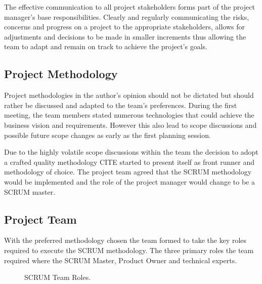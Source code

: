 \documentclass[12pt]{witseiepaper}
\begin{document}
The effective communication to all project stakeholders forms part of the project manager’s base responsibilities. Clearly and regularly communicating the risks, concerns and progress on a project to the appropriate stakeholders, allows for adjustments and decisions to be made in smaller increments thus allowing the team to adapt and remain on track to achieve the project’s goals.

\subsection{Project Methodology}
Project methodologies in the author's opinion should not be dictated but should rather be discussed and adapted to the team's preferences. During the first meeting, the team members stated numerous technologies that could achieve the business vision and requirements. However this also lead to scope discussions and possible future scope changes as early as the first planning session.

Due to the highly volatile scope discussions within the team the decision to adopt a crafted quality methodology CITE started to present itself as front runner and methodology of choice. The project team agreed that the SCRUM methodology \cite{ExpertJudgement} would be implemented and the role of the project manager would change to be a SCRUM master. \cite{SCUMMaster}

\subsection{Project Team}

With the preferred methodology chosen the team formed to take the key roles required to execute the SCRUM methodology. The three primary roles the team required where the SCRUM Master, Product Owner and technical experts.\\

\begin{figure}[H]
	\caption{SCRUM Team Roles.} 
	\label{fig:SCRUMTeam}
\end{figure}
\end{document}
